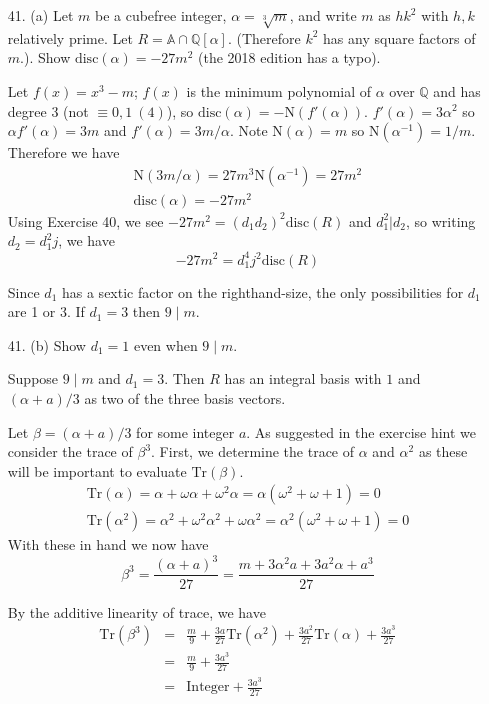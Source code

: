 \documentclass{article}
\newcommand{\w}[0]{\omega}
\newcommand{\Q}[0]{\mathbb{Q}}
\newcommand{\trace}[1]{\text{Tr}(#1)}
\newcommand{\norm}[1]{\text{N}(#1)}
\newcommand{\disc}[1]{\text{disc}(#1)}
\begin{document}
\begin{enumerate}
\item[41. (a)] Let $m$ be a cubefree integer, $\alpha = \sqrt[3]{m}$, and write $m$ as $hk^2$ with $h, k$ relatively prime.  Let $R = \mathbb{A} \cap \Q[\alpha]$.  (Therefore $k^2$ has any square factors of $m$.).  Show $\disc{\alpha} = -27m^2$ (the 2018 edition has a typo).

Let $f(x) = x^3 - m$; $f(x)$ is the minimum polynomial of $\alpha$ over $\Q$ and has degree 3 (not $\equiv 0, 1\ (4)$), so $\disc{\alpha} = -\norm{f'(\alpha)}$.  $f'(\alpha) = 3\alpha^2$ so $\alpha f'(\alpha) = 3m$ and $f'(\alpha) = 3m / \alpha$.  Note $\norm{\alpha} = m$ so $\norm{\alpha^{-1}} = 1/m$.  Therefore we have
\begin{gather*}
    \norm{3m/\alpha} = 27m^3 \norm{\alpha^{-1}} = 27m^2 \\
    \disc{\alpha} = -27m^2
\end{gather*}
Using Exercise 40, we see $-27m^2 = (d_1 d_2)^2 \disc{R}$ and $d_1^2 | d_2$, so writing $d_2 = d_1^2 j$, we have \[ -27m^2 = d_1^4 j^2 \disc{R} \]

Since $d_1$ has a sextic factor on the righthand-size, the only possibilities for $d_1$ are 1 or 3.  If $d_1 = 3$ then $9 \mid m$.

\item[41. (b)]  Show $d_1 = 1$ even when $9 \mid m$.

Suppose $9 \mid m$ and $d_1 = 3$.  Then $R$ has an integral basis with $1$ and $(\alpha + a)/3$ as two of the three basis vectors.

Let $\beta = (\alpha + a) / 3$ for some integer $a$.  As suggested in the exercise hint we consider the trace of $\beta^3$.  First, we determine the trace of $\alpha$ and $\alpha^2$ as these will be important to evaluate $\trace{\beta}$.
\begin{gather*}
    \trace{\alpha} = \alpha + \w\alpha + \w^2\alpha = \alpha(\w^2 + \w + 1) = 0\\
    \trace{\alpha^2} = \alpha^2 + \w^2 \alpha^2 + \w\alpha^2 = \alpha^2(\w^2 + \w + 1) = 0
\end{gather*}
With these in hand we now have \[ \beta^3 = \frac{(\alpha + a)^3}{27} = \frac{m + 3\alpha^2 a + 3a^2 \alpha + a^3}{27} \]

By the additive linearity of trace, we have
\begin{eqnarray*}
    \trace{\beta^3} &=& \frac{m}{9} + \frac{3a}{27}\trace{\alpha^2} + \frac{3a^2}{27}\trace{\alpha} + \frac{3a^3}{27}\\
    &=& \frac{m}{9} + \frac{3a^3}{27} \\
    &=& \text{Integer} + \frac{3a^3}{27}
\end{eqnarray*}


\end{enumerate}
\end{document}
